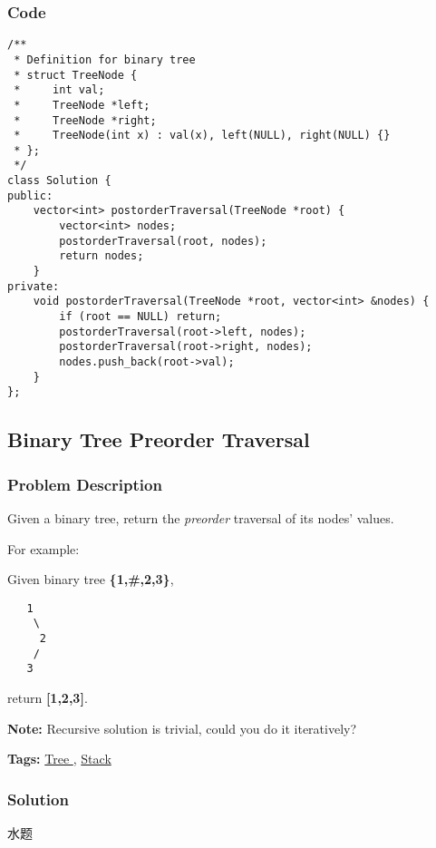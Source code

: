 \documentclass{article}
\begin{document}
\begin{CJK*}{UTF8}{gkai}
\subsubsection*{Code}
\begin{lstlisting}
/**
 * Definition for binary tree
 * struct TreeNode {
 *     int val;
 *     TreeNode *left;
 *     TreeNode *right;
 *     TreeNode(int x) : val(x), left(NULL), right(NULL) {}
 * };
 */
class Solution {
public:
    vector<int> postorderTraversal(TreeNode *root) {
        vector<int> nodes;
        postorderTraversal(root, nodes);
        return nodes;
    }
private:
    void postorderTraversal(TreeNode *root, vector<int> &nodes) {
        if (root == NULL) return;
        postorderTraversal(root->left, nodes);
        postorderTraversal(root->right, nodes);
        nodes.push_back(root->val);
    }
}; 
\end{lstlisting}


\subsection{ Binary Tree Preorder Traversal }
\label{ Binary Tree Preorder Traversal }

\subsubsection*{Problem Description}
Given a binary tree, return the \emph{preorder} traversal of its nodes' values.

For example:


Given binary tree \textbf{\{1,\#,2,3\}},


\begin{verbatim}
   1
    \
     2
    /
   3
\end{verbatim}

return \textbf{[1,2,3]}.

\textbf{Note:} Recursive solution is trivial, could you do it iteratively?


\textbf{Tags: }
\hyperref[ Tree ]{ Tree },  \hyperref[ Stack ]{ Stack }



\subsubsection*{Solution}
水题


\end{CJK*}
\end{document}
